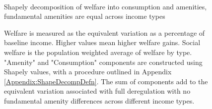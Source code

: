 \documentclass[12pt]{article}
\begin{document}
	\begin{figure}[htbp!]
			\caption{ \\ Shapely decomposition of welfare into consumption and amenities, \\
					fundamental amenities are equal across income types}\label{figure:welfareDecompNoFund_ctfl}
					
				\caption*{Welfare is measured as the equivalent variation as a percentage of baseline income. Higher values mean higher welfare gains. Social welfare is the population weighted average of welfare by type. "Amenity" and "Consumption" components are constructed using Shapely values, with a procedure outlined in Appendix \ref{Appendix:ShapeDecompDefn}. The sum of components add to the equivalent variation associated with full deregulation with no fundamental amenity differences across different income types.}
		
	\end{figure}
	
	
	
\end{document}

